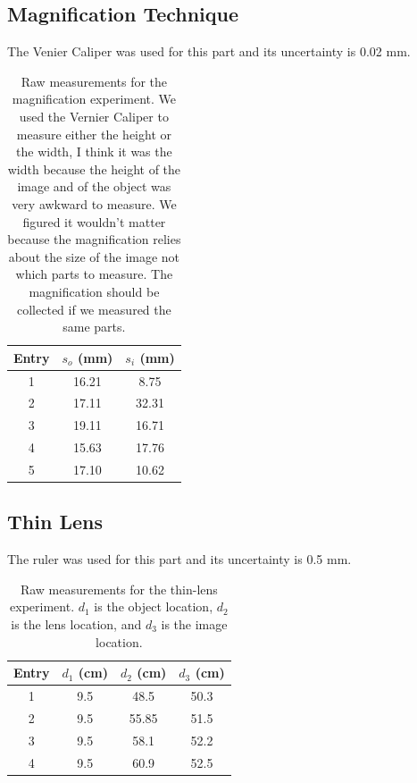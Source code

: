 \documentclass{article}
\begin{document}
\subsection{Magnification Technique}
The Venier Caliper was used for this part and its uncertainty is 0.02 mm.
\begin{table}[H]
    \centering
    \begin{tabular}{ccc}
        \hline
        Entry & $s_o$ (mm) & $s_i$ (mm) \\
        \hline
        1 & 16.21 & 8.75 \\
        2 & 17.11 & 32.31 \\
        3 & 19.11 & 16.71 \\
        4 & 15.63 & 17.76 \\
        5 & 17.10 & 10.62 \\
        \hline
    \end{tabular}
    \caption{Raw measurements for the magnification experiment. 
    We used the Vernier Caliper to measure either the height or 
    the width, I think it was the width because the height of the
    image and of the object was very awkward to measure.
    We figured it wouldn't matter because the magnification relies
    about the size of the image not which parts to measure. 
    The magnification should be collected if we measured the same parts.
    }
    \label{tab:magnification}
\end{table}

\subsection{Thin Lens}
The ruler was used for this part and its uncertainty is 0.5 mm.

\begin{table}[H]
    \centering
    \begin{tabular}{cccc}
        \hline
        Entry & $d_1$ (cm) & $d_2$ (cm) & $d_3$ (cm) \\
        \hline
        1 & 9.5 & 48.5  & 50.3 \\
        2 & 9.5 & 55.85 & 51.5 \\
        3 & 9.5 & 58.1  & 52.2 \\
        4 & 9.5 & 60.9  & 52.5 \\
        \hline
    \end{tabular}
    \caption{Raw measurements for the thin-lens experiment. $d_1$ is the object location, $d_2$ is the lens location, and $d_3$ is the image location.}
    \label{tab:thin_lens}
\end{table}
\end{document}
